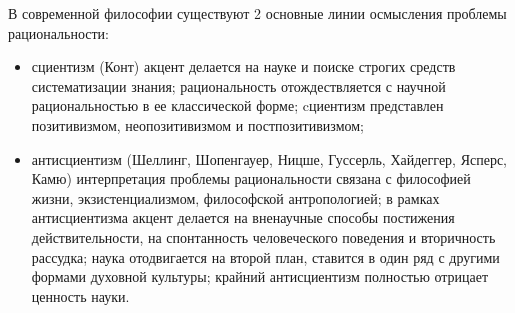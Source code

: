 В современной философии существуют 2 основные линии осмысления проблемы рациональности: 
\begin{itemize}
	\item сциентизм (Конт) акцент делается на науке и поиске строгих средств систематизации знания; рациональность отождествляется с научной рациональностью в ее классической форме; cциентизм представлен позитивизмом, неопозитивизмом и постпозитивизмом;
	\item антисциентизм (Шеллинг, Шопенгауер, Ницше, Гуссерль, Хайдеггер, Ясперс, Камю) интерпретация проблемы рациональности связана с философией жизни, экзистенциализмом, философской антропологией; в рамках антисциентизма акцент делается на вненаучные способы постижения действительности, на спонтанность человеческого поведения и вторичность рассудка; наука отодвигается на второй план, ставится в один ряд с другими формами духовной культуры; крайний антисциентизм полностью отрицает ценность науки.
\end{itemize}